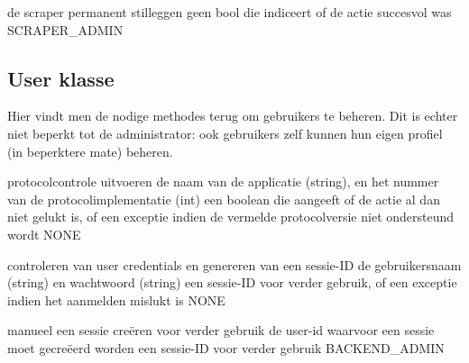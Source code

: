 	{ de scraper permanent stilleggen }
	{ geen }
	{ bool die indiceert of de actie succesvol was }
	{ SCRAPER\_ADMIN }

\subsection{User klasse}

Hier vindt men de nodige methodes terug om gebruikers te beheren. Dit is echter niet beperkt tot de administrator: ook gebruikers zelf kunnen hun eigen profiel (in beperktere mate) beheren.

	{ protocolcontrole uitvoeren }
	{ de naam van de applicatie (string), en het nummer van de protocolimplementatie (int) }
	{ een boolean die aangeeft of de actie al dan niet gelukt is, of een exceptie indien de vermelde protocolversie niet ondersteund wordt }
	{ NONE }
	
	{ controleren van user credentials en genereren van een sessie-ID }
	{ de gebruikersnaam (string) en wachtwoord (string) }
	{ een sessie-ID voor verder gebruik, of een exceptie indien het aanmelden mislukt is }
	{ NONE }
		
	{ manueel een sessie cre\"eren voor verder gebruik }
	{ de user-id waarvoor een sessie moet gecre\"eerd worden }
	{ een sessie-ID voor verder gebruik }
	{ BACKEND\_ADMIN }

